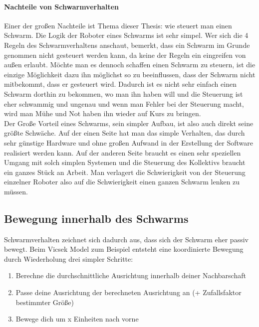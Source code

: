 \paragraph*{Nachteile von Schwarmverhalten}

Einer der großen Nachteile ist Thema dieser Thesis: wie steuert man einen Schwarm. Die Logik der Roboter eines Schwarms ist sehr simpel. Wer sich die 4 Regeln des Schwarmverhaltens anschaut, bemerkt, dass ein Schwarm im Grunde genommen nicht gesteuert werden kann, da keine der Regeln ein eingreifen von außen erlaubt. Möchte man es dennoch schaffen einen Schwarm zu steuern, ist die einzige Möglichkeit dazu ihn möglichst so zu beeinflussen, dass der Schwarm nicht mitbekommt, dass er gesteuert wird. Dadurch ist es nicht sehr einfach einen Schwarm dorthin zu bekommen, wo man ihn haben will und die Steuerung ist eher schwammig und ungenau und wenn man Fehler bei der Steuerung macht, wird man Mühe und Not haben ihn wieder auf Kurs zu bringen.\\

Der Große Vorteil eines Schwarms, sein simpler Aufbau, ist also auch direkt seine größte Schwäche. Auf der einen Seite hat man das simple Verhalten, das durch sehr günstige Hardware und ohne großen Aufwand in der Erstellung der Software realisiert werden kann. Auf der anderen Seite braucht es einen sehr speziellen Umgang mit solch simplen Systemen und die Steuerung des Kollektivs braucht ein ganzes Stück an Arbeit. Man verlagert die Schwierigkeit von der Steuerung einzelner Roboter also auf die Schwierigkeit einen ganzen Schwarm lenken zu müssen.

\subsection{Bewegung innerhalb des Schwarms}\label{subsec:BewegungImSchwarm}

Schwarmverhalten zeichnet sich dadurch aus, dass sich der Schwarm eher passiv bewegt.
Beim Vicsek Model\cite{VicsekGeneral}
zum Beispiel entsteht eine koordinierte Bewegung durch Wiederholung drei simpler Schritte:

\begin{enumerate}
	\item Berechne die durchschnittliche Ausrichtung innerhalb deiner Nachbarschaft
	\item Passe deine Ausrichtung der berechneten Ausrichtung an (+ Zufallsfaktor bestimmter Größe)
	\item Bewege dich um x Einheiten nach vorne
\end{enumerate}

